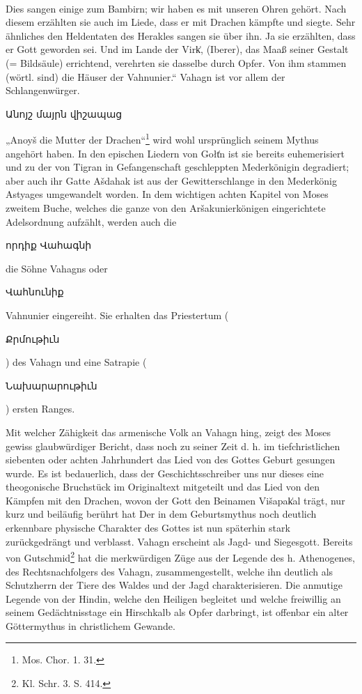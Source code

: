 \documentclass{article}
\begin{document}
\paragraph{}
Dies sangen einige zum Bambirn; wir haben es mit unseren Ohren gehört. Nach diesem erzählten sie auch im Liede, dass er mit Drachen kämpfte und siegte. Sehr ähnliches den Heldentaten des Herakles sangen sie über ihn. Ja sie erzählten, dass er Gott geworden sei. Und im Lande der Virk͑, (Iberer), das Maaß seiner Gestalt (= Bildsäule) errichtend, verehrten sie dasselbe durch Opfer. Von ihm stammen (wörtl. sind) die Häuser der Vahnunier.“ Vahagn ist vor allem der Schlangenwürger. \begin{armenian}Անոյշ մայրն վիշապաց\end{armenian} „Anoyš die Mutter der Drachen“\footnote{Mos. Chor. 1. 31.} wird wohl ursprünglich seinem Mythus angehört haben. In den epischen Liedern von Gołt͑n ist sie bereits euhemerisiert und zu der von Tigran in Gefangenschaft geschleppten Mederkönigin degradiert; aber auch ihr Gatte Ašdahak ist aus der Gewitterschlange in den Mederkönig Astyages umgewandelt worden. In dem wichtigen achten Kapitel von Moses zweitem Buche, welches die ganze von den Aršakunierkönigen eingerichtete Adelsordnung aufzählt, werden auch die \begin{armenian}որդիք Վահագնի\end{armenian} die Söhne Vahagns oder \begin{armenian}Վահնունիք\end{armenian} Vahnunier eingereiht. Sie erhalten das Priestertum (\begin{armenian}Քրմութիւն\end{armenian}) des Vahagn und eine Satrapie (\begin{armenian}Նախարարութիւն\end{armenian}) ersten Ranges.

Mit welcher Zähigkeit das armenische Volk an Vahagn hing, zeigt des Moses gewiss glaubwürdiger Bericht, dass noch zu seiner Zeit d. h. im tiefchristlichen siebenten oder achten Jahrhundert das Lied von des Gottes Geburt gesungen wurde. Es ist bedauerlich, dass der Geschichtsschreiber uns nur dieses eine theogonische Bruchstück im Originaltext mitgeteilt und das Lied von den Kämpfen mit den Drachen, wovon der Gott den Beinamen Višapak͑al trägt, nur kurz und beiläufig berührt hat Der in dem Geburtsmythus noch deutlich erkennbare physische Charakter des Gottes ist nun späterhin stark zurückgedrängt und verblasst. Vahagn erscheint als Jagd- und Siegesgott. Bereits von Gutschmid\footnote{Kl. Schr. 3. S. 414.} hat die merkwürdigen Züge aus der Legende des h. Athenogenes, des Rechtsnachfolgers des Vahagn, zusammengestellt, welche ihn deutlich als Schutzherrn der Tiere des Waldes und der Jagd charakterisieren. Die anmutige Legende von der Hindin, welche den Heiligen begleitet und welche freiwillig an seinem Gedächtnisstage ein Hirschkalb als Opfer darbringt, ist offenbar ein alter Göttermythus in christlichem Gewande.
\end{document}
